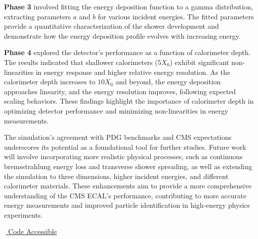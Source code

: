 \documentclass[twocolumn]{aastex631}
\begin{document}
\textbf{Phase 3} involved fitting the energy deposition function to a gamma
distribution, extracting parameters $a$ and $b$ for various incident energies. The
fitted parameters provide a quantitative characterization of the shower
development and demonstrate how the energy deposition profile evolves with
increasing energy.

\textbf{Phase 4} explored the detector’s performance as a function of
calorimeter depth. The results indicated that shallower calorimeters (5$X_0$)
exhibit significant non-linearities in energy response and higher relative
energy resolution. As the calorimeter depth increases to $10X_0$ and beyond, the
energy deposition approaches linearity, and the energy resolution improves,
following expected scaling behaviors. These findings highlight the importance
of calorimeter depth in optimizing detector performance and minimizing
non-linearities in energy measurements.

The simulation’s agreement with PDG benchmarks and CMS expectations underscores
its potential as a foundational tool for further studies. Future work will
involve incorporating more realistic physical processes, such as continuous
bremsstrahlung energy loss and transverse shower spreading, as well as extending
the simulation to three dimensions, higher incident energies, and different calorimeter materials.
These enhancements aim to provide a more comprehensive understanding of the
CMS ECAL’s performance, contributing to more accurate energy measurements and
improved particle identification in high-energy physics experiments.

\vspace{20px}

\begin{center}
    \href{https://github.com/devdeliw/ECAL_MonteCarlo}{\faGithub $\;$ Code Accessible}
\end{center}



\newpage

\nocite{*}
\end{document}
